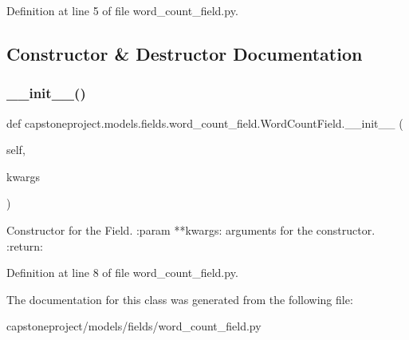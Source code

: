 Definition at line 5 of file word\+\_\+count\+\_\+field.\+py.



\subsection{Constructor \& Destructor Documentation}
\mbox{\label{classcapstoneproject_1_1models_1_1fields_1_1word__count__field_1_1_word_count_field_ac6f8bd2a60ce73f4a214b7a852ab45e0}} 
\subsubsection{\texorpdfstring{\+\_\+\+\_\+init\+\_\+\+\_\+()}{\_\_init\_\_()}}
{\footnotesize\ttfamily def capstoneproject.\+models.\+fields.\+word\+\_\+count\+\_\+field.\+Word\+Count\+Field.\+\_\+\+\_\+init\+\_\+\+\_\+ (\begin{DoxyParamCaption}\item[{}]{self,  }\item[{}]{kwargs }\end{DoxyParamCaption})}

\begin{DoxyVerb}Constructor for the Field.
:param **kwargs: arguments for the constructor.
:return:
\end{DoxyVerb}
 

Definition at line 8 of file word\+\_\+count\+\_\+field.\+py.



The documentation for this class was generated from the following file\+:\begin{DoxyCompactItemize}
\item 
capstoneproject/models/fields/word\+\_\+count\+\_\+field.\+py\end{DoxyCompactItemize}
